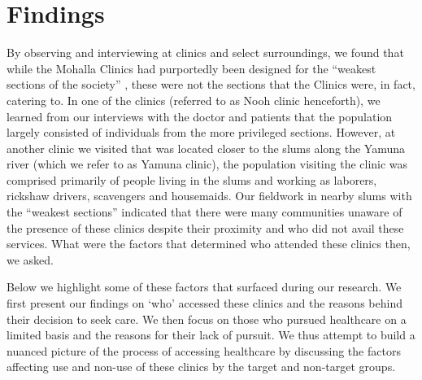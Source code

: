 \section{Findings}%
By observing and interviewing at clinics and select surroundings, we found that while the Mohalla Clinics had purportedly been designed for the ``weakest sections of the society'' \cite{AAPpressrelease}, these were not the sections that the Clinics were, in fact, catering to. In one of the clinics (referred to as Nooh clinic henceforth), we learned from our interviews with the doctor and patients that the population largely consisted of individuals from the more privileged sections. However, at another clinic we visited that was located closer to the slums along the Yamuna river (which we refer to as Yamuna clinic), the population visiting the clinic was comprised primarily of people living in the slums and working as laborers, rickshaw drivers, scavengers and housemaids. Our fieldwork in nearby slums with the ``weakest sections'' indicated that there were many communities unaware of the presence of these clinics despite their proximity and who did not avail these services. What were the factors that determined who attended these clinics then, we asked.%

Below we highlight some of these factors that surfaced during our research. We first present our findings on `who' accessed these clinics and the reasons behind their decision to seek care. We then focus on those who pursued healthcare on a limited basis and the reasons for their lack of pursuit. We thus attempt to build a nuanced picture of the process of accessing healthcare by discussing the factors affecting use and non-use of these clinics by the target and non-target groups.
